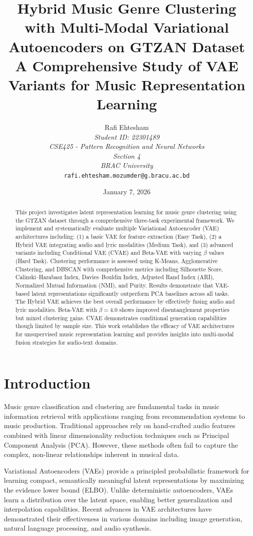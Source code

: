 \documentclass[11pt]{article}
\title{\textbf{Hybrid Music Genre Clustering with Multi-Modal Variational Autoencoders on GTZAN Dataset}\\
\large A Comprehensive Study of VAE Variants for Music Representation Learning}
\author{
  Rafi Ehtesham \\
  \textit{Student ID: 22301489} \\
  \textit{CSE425 - Pattern Recognition and Neural Networks} \\
  \textit{Section 4} \\
  \textit{BRAC University} \\
  \texttt{rafi.ehtesham.mozumder@g.bracu.ac.bd}
}
\date{January 7, 2026}
\begin{document}
\maketitle

\begin{abstract}
This project investigates latent representation learning for music genre clustering using the GTZAN dataset through a comprehensive three-task experimental framework. We implement and systematically evaluate multiple Variational Autoencoder (VAE) architectures including: (1) a basic VAE for feature extraction (Easy Task), (2) a Hybrid VAE integrating audio and lyric modalities (Medium Task), and (3) advanced variants including Conditional VAE (CVAE) and Beta-VAE with varying $\beta$ values (Hard Task). Clustering performance is assessed using K-Means, Agglomerative Clustering, and DBSCAN with comprehensive metrics including Silhouette Score, Calinski--Harabasz Index, Davies--Bouldin Index, Adjusted Rand Index (ARI), Normalized Mutual Information (NMI), and Purity. Results demonstrate that VAE-based latent representations significantly outperform PCA baselines across all tasks. The Hybrid VAE achieves the best overall performance by effectively fusing audio and lyric modalities. Beta-VAE with $\beta=4.0$ shows improved disentanglement properties but mixed clustering gains. CVAE demonstrates conditional generation capabilities though limited by sample size. This work establishes the efficacy of VAE architectures for unsupervised music representation learning and provides insights into multi-modal fusion strategies for audio-text domains.
\end{abstract}

\section{Introduction}
Music genre classification and clustering are fundamental tasks in music information retrieval with applications ranging from recommendation systems to music production. Traditional approaches rely on hand-crafted audio features combined with linear dimensionality reduction techniques such as Principal Component Analysis (PCA). However, these methods often fail to capture the complex, non-linear relationships inherent in musical data.

Variational Autoencoders (VAEs) \cite{kingma2014} provide a principled probabilistic framework for learning compact, semantically meaningful latent representations by maximizing the evidence lower bound (ELBO). Unlike deterministic autoencoders, VAEs learn a distribution over the latent space, enabling better generalization and interpolation capabilities. Recent advances in VAE architectures have demonstrated their effectiveness in various domains including image generation, natural language processing, and audio synthesis.
\end{document}
